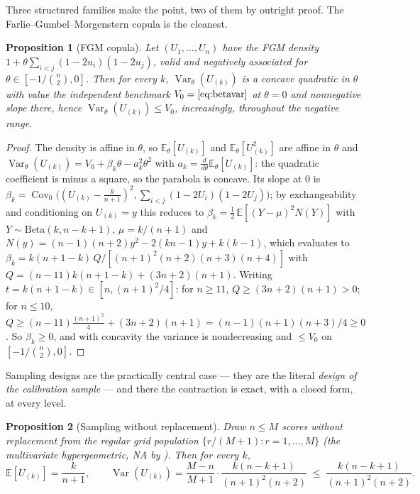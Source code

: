 \documentclass[11pt]{article}
\newtheorem{proposition}{Proposition}
\begin{document}
Three structured families make the point, two of them by outright proof. The
Farlie--Gumbel--Morgenstern copula is the cleanest.

\begin{proposition}[FGM copula]\label{prop:fgm}
Let $(U_1,\dots,U_n)$ have the FGM density $1+\theta\sum_{i<j}(1-2u_i)(1-2u_j)$, valid and negatively
associated for $\theta\in[-1/\binom n2,0]$. Then for every $k$, $\operatorname{Var}_\theta(U_{(k)})$ is
a concave quadratic in $\theta$ with value the independent benchmark $V_0=\eqref{eq:betavar}$ at
$\theta=0$ and nonnegative slope there, hence $\operatorname{Var}_\theta(U_{(k)})\le V_0$, increasingly,
throughout the negative range.
\end{proposition}

\begin{proof}
The density is affine in $\theta$, so $\mathbb E_\theta[U_{(k)}]$ and $\mathbb E_\theta[U_{(k)}^2]$ are
affine in $\theta$ and $\operatorname{Var}_\theta(U_{(k)})=V_0+\beta_k\theta-a_k^2\theta^2$ with
$a_k=\tfrac{d}{d\theta}\mathbb E_\theta[U_{(k)}]$: the quadratic coefficient is minus a square, so the
parabola is concave. Its slope at $0$ is
$\beta_k=\operatorname{Cov}_0\!\big((U_{(k)}-\tfrac k{n+1})^2,\sum_{i<j}(1-2U_i)(1-2U_j)\big)$; by
exchangeability and conditioning on $U_{(k)}=y$ this reduces to
$\beta_k=\tfrac12\,\mathbb E[(Y-\mu)^2N(Y)]$ with $Y\sim\mathrm{Beta}(k,n{-}k{+}1)$, $\mu=k/(n+1)$ and
$N(y)=(n-1)(n+2)y^2-2(kn-1)y+k(k-1)$, which evaluates to
$\beta_k=k(n{+}1{-}k)\,Q/[(n+1)^2(n+2)(n+3)(n+4)]$ with $Q=(n-11)k(n{+}1{-}k)+(3n+2)(n+1)$. Writing
$t=k(n{+}1{-}k)\in[n,(n+1)^2/4]$: for $n\ge11$, $Q\ge(3n+2)(n+1)>0$; for $n\le10$,
$Q\ge(n-11)\tfrac{(n+1)^2}4+(3n+2)(n+1)=(n-1)(n+1)(n+3)/4\ge0$. So $\beta_k\ge0$, and with concavity the
variance is nondecreasing and $\le V_0$ on $[-1/\binom n2,0]$.
\end{proof}

Sampling designs are the practically central case --- they are the literal \emph{design of the
calibration sample} --- and there the contraction is exact, with a closed form, at every level.

\begin{proposition}[Sampling without replacement]\label{prop:wor}
Draw $n\le M$ scores without replacement from the regular grid population $\{r/(M+1):r=1,\dots,M\}$ (the
multivariate hypergeometric, NA by \citealp{joagdev1983}). Then for every $k$,
\[
\mathbb E[U_{(k)}]=\frac{k}{n+1},\qquad
\operatorname{Var}(U_{(k)})=\frac{M-n}{M+1}\cdot\frac{k(n-k+1)}{(n+1)^2(n+2)}\;\le\;\frac{k(n-k+1)}{(n+1)^2(n+2)} .
\]
\end{proposition}
\end{document}
